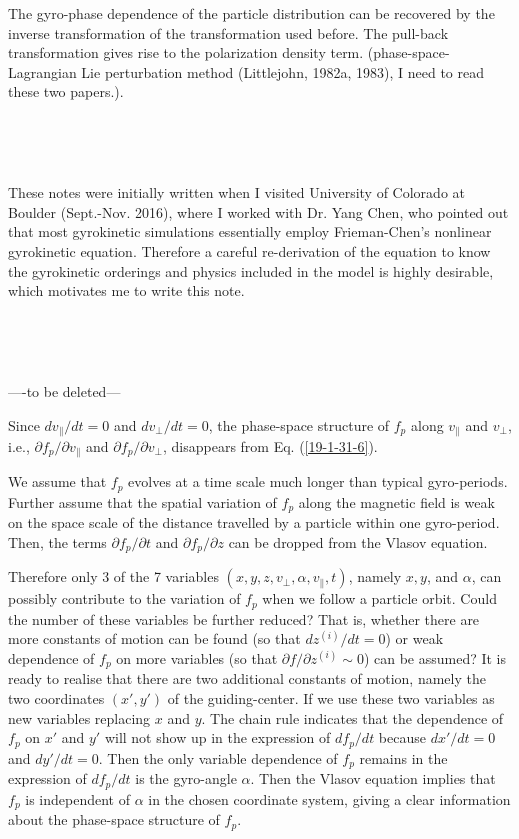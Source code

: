 \documentclass{llncs}
\begin{document}
The gyro-phase dependence of the particle distribution can be recovered by
the inverse transformation of the transformation used before. The pull-back
transformation gives rise to the polarization density term.
(phase-space-Lagrangian Lie perturbation method (Littlejohn, 1982a, 1983), I
need to read these two papers.).

\

\

These notes were initially written when I visited University of Colorado at
Boulder (Sept.-Nov. 2016), where I worked with Dr. Yang Chen, who pointed out
that most gyrokinetic simulations essentially employ Frieman-Chen's nonlinear
gyrokinetic equation. Therefore a careful re-derivation of the equation to
know the gyrokinetic orderings and physics included in the model is highly
desirable, which motivates me to write this note.

\

\

----to be deleted---

Since $d v_{\parallel} / d t = 0$ and $d v_{\perp} / d t = 0$, the
phase-space structure of $f_p$ along $v_{\parallel}$ and $v_{\perp}$, i.e.,
$\partial f_p / \partial v_{\parallel}$ and $\partial f_p / \partial
v_{\perp}$, disappears from Eq. (\ref{19-1-31-6}).

We assume that $f_p$ evolves at a time scale much longer than typical
gyro-periods. Further assume that the spatial variation of $f_p$ along the
magnetic field is weak on the space scale of the distance travelled by a
particle within one gyro-period. Then, the terms $\partial f_p / \partial t$
and $\partial f_p / \partial z$ can be dropped from the Vlasov equation.

Therefore only 3 of the 7 variables $(x, y, z, v_{\perp}, \alpha,
v_{\parallel}, t)$, namely $x, y$, and $\alpha$, can possibly contribute to
the variation of $f_p$ when we follow a particle orbit. Could the number of
these variables be further reduced? That is, whether there are more constants
of motion can be found (so that $d z^{(i)} / d t = 0$) or weak dependence of
$f_p$ on more variables (so that $\partial f / \partial z^{(i)} \sim 0$) can
be assumed? It is ready to realise that there are two additional constants of
motion, namely the two coordinates $(x', y')$ of the guiding-center. If we use
these two variables as new variables replacing $x$ and $y$. The chain rule
indicates that the dependence of $f_p$ on $x'$ and $y'$ will not show up in
the expression of $d f_p / d t$ because $d x' / d t = 0$ and $d y' / d t = 0$.
Then the only variable dependence of $f_p$ remains in the expression of $d f_p
/ d t$ is the gyro-angle $\alpha$. Then the Vlasov equation implies that $f_p$
is independent of $\alpha$ in the chosen coordinate system, giving a clear
information about the phase-space structure of $f_p$.
\end{document}

